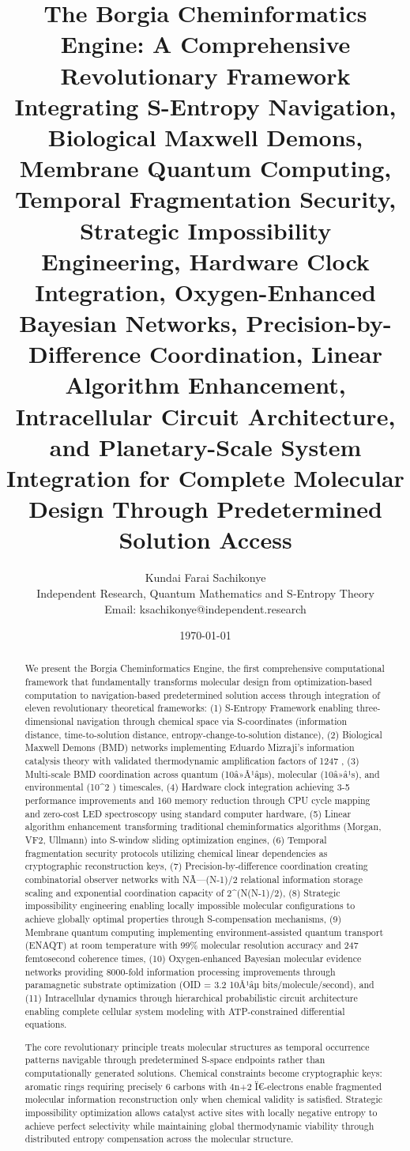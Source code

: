﻿\documentclass[11pt,a4paper]{article}
\title{The Borgia Cheminformatics Engine: A Comprehensive Revolutionary Framework Integrating S-Entropy Navigation, Biological Maxwell Demons, Membrane Quantum Computing, Temporal Fragmentation Security, Strategic Impossibility Engineering, Hardware Clock Integration, Oxygen-Enhanced Bayesian Networks, Precision-by-Difference Coordination, Linear Algorithm Enhancement, Intracellular Circuit Architecture, and Planetary-Scale System Integration for Complete Molecular Design Through Predetermined Solution Access}
\author{Kundai Farai Sachikonye\\
Independent Research, Quantum Mathematics and S-Entropy Theory\\
Email: ksachikonye@independent.research}
\date{\today}
\begin{document}
\maketitle

\begin{abstract}

We present the Borgia Cheminformatics Engine, the first comprehensive computational framework that fundamentally transforms molecular design from optimization-based computation to navigation-based predetermined solution access through integration of eleven revolutionary theoretical frameworks: (1) S-Entropy Framework enabling three-dimensional navigation through chemical space via S-coordinates (information distance, time-to-solution distance, entropy-change-to-solution distance), (2) Biological Maxwell Demons (BMD) networks implementing Eduardo Mizraji's information catalysis theory with validated thermodynamic amplification factors of 1247  \times, (3) Multi-scale BMD coordination across quantum (10â»Â¹âµs), molecular (10â»â¹s), and environmental (10^{2} ) timescales, (4) Hardware clock integration achieving 3-5 \times performance improvements and 160 \times memory reduction through CPU cycle mapping and zero-cost LED spectroscopy using standard computer hardware, (5) Linear algorithm enhancement transforming traditional cheminformatics algorithms (Morgan, VF2, Ullmann) into S-window sliding optimization engines, (6) Temporal fragmentation security protocols utilizing chemical linear dependencies as cryptographic reconstruction keys, (7) Precision-by-difference coordination creating combinatorial observer networks with NÃ—(N-1)/2 relational information storage scaling and exponential coordination capacity of 2^(N(N-1)/2), (8) Strategic impossibility engineering enabling locally impossible molecular configurations to achieve globally optimal properties through S-compensation mechanisms, (9) Membrane quantum computing implementing environment-assisted quantum transport (ENAQT) at room temperature with 99\% molecular resolution accuracy and 247  femtosecond coherence times, (10) Oxygen-enhanced Bayesian molecular evidence networks providing 8000-fold information processing improvements through paramagnetic substrate optimization (OID = 3.2 \times10Â¹âµ bits/molecule/second), and (11) Intracellular dynamics through hierarchical probabilistic circuit architecture enabling complete cellular system modeling with ATP-constrained differential equations.

The core revolutionary principle treats molecular structures as temporal occurrence patterns navigable through predetermined S-space endpoints rather than computationally generated solutions. Chemical constraints become cryptographic keys: aromatic rings requiring precisely 6 carbons with 4n+2 Ï€-electrons enable fragmented molecular information reconstruction only when chemical validity is satisfied. Strategic impossibility optimization allows catalyst active sites with locally negative entropy to achieve perfect selectivity while maintaining global thermodynamic viability through distributed entropy compensation across the molecular structure.


\end{abstract}
\end{document}
